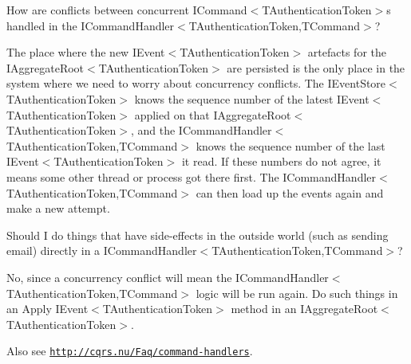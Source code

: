 How are conflicts between concurrent I\+Command$<$\+T\+Authentication\+Token$>$s handled in the I\+Command\+Handler$<$\+T\+Authentication\+Token,\+T\+Command$>$?

The place where the new I\+Event$<$\+T\+Authentication\+Token$>$ artefacts for the I\+Aggregate\+Root$<$\+T\+Authentication\+Token$>$ are persisted is the only place in the system where we need to worry about concurrency conflicts. The I\+Event\+Store$<$\+T\+Authentication\+Token$>$ knows the sequence number of the latest I\+Event$<$\+T\+Authentication\+Token$>$ applied on that I\+Aggregate\+Root$<$\+T\+Authentication\+Token$>$, and the I\+Command\+Handler$<$\+T\+Authentication\+Token,\+T\+Command$>$ knows the sequence number of the last I\+Event$<$\+T\+Authentication\+Token$>$ it read. If these numbers do not agree, it means some other thread or process got there first. The I\+Command\+Handler$<$\+T\+Authentication\+Token,\+T\+Command$>$ can then load up the events again and make a new attempt.

Should I do things that have side-\/effects in the outside world (such as sending email) directly in a I\+Command\+Handler$<$\+T\+Authentication\+Token,\+T\+Command$>$?

No, since a concurrency conflict will mean the I\+Command\+Handler$<$\+T\+Authentication\+Token,\+T\+Command$>$ logic will be run again. Do such things in an Apply I\+Event$<$\+T\+Authentication\+Token$>$ method in an I\+Aggregate\+Root$<$\+T\+Authentication\+Token$>$. 

 Also see \href{http://cqrs.nu/Faq/command-handlers}{\tt http\+://cqrs.\+nu/\+Faq/command-\/handlers}. 